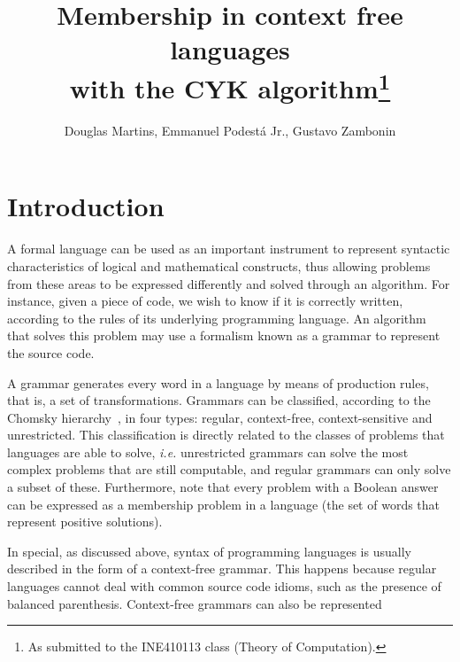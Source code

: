 \documentclass[12pt]{article}
\title{Membership in context free languages \\ with the CYK algorithm\footnote{
    As submitted to the INE410113 class (Theory of Computation).}}
\author{Douglas Martins\inst{1}, Emmanuel Podestá Jr.\inst{1}, Gustavo Zambonin\inst{1}}
\begin{document}
 

\maketitle

\section{Introduction}\label{sec:intro}
A formal language can be used as an important instrument to represent syntactic characteristics of logical and mathematical constructs, thus allowing problems from these areas to be expressed differently and solved through an algorithm. For instance, given a piece of code, we wish to know if it is correctly written, according to the rules of its underlying programming language. An algorithm that solves this problem may use a formalism known as a grammar to represent the source code.

A grammar generates every word in a language by means of production rules, that is, a set of transformations. Grammars can be classified, according to the Chomsky hierarchy~\cite{}, in four types: regular, context-free, context-sensitive and unrestricted. This classification is directly related to the classes of problems that languages are able to solve, \emph{i.e.} unrestricted grammars can solve the most complex problems that are still computable, and regular grammars can only solve a subset of these. Furthermore, note that every problem with a Boolean answer can be expressed as a membership problem in a language (the set of words that represent positive solutions).

In special, as discussed above, syntax of programming languages is usually described in the form of a context-free grammar. This happens because regular languages cannot deal with common source code idioms, such as the presence of balanced parenthesis. Context-free grammars can also be represented 



\end{document}
